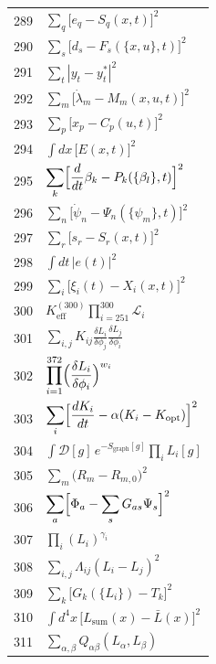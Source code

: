 \documentclass[12pt,a4paper]{article}
\begin{document}
\begin{longtable}{r p{}}
	289 & \(\displaystyle \sum_q\bigl[e_q - S_q(x,t)\bigr]^2\) \\
	290 & \(\displaystyle \sum_s\bigl[d_s - F_s(\{x,u\},t)\bigr]^2\) \\
	291 & \(\displaystyle \sum_t|y_t - y_t^*|^2\) \\
	292 & \(\displaystyle \sum_m\bigl[\dot\lambda_m - M_m(x,u,t)\bigr]^2\) \\
	293 & \(\displaystyle \sum_p\bigl[x_p - C_p(u,t)\bigr]^2\) \\
	294 & \(\displaystyle \int dx\,\bigl[E(x,t)\bigr]^2\) \\
	295 & \(\displaystyle \sum_k\Bigl[\frac{d}{dt}\beta_k - P_k(\{\beta_l\},t)\Bigr]^2\) \\
	296 & \(\displaystyle \sum_n\bigl[\dot\psi_n - \Psi_n(\{\psi_m\},t)\bigr]^2\) \\
	297 & \(\displaystyle \sum_r\bigl[s_r - S_r(x,t)\bigr]^2\) \\
	298 & \(\displaystyle \int dt\,|e(t)|^2\) \\
	299 & \(\displaystyle \sum_i\bigl[\xi_i(t) - X_i(x,t)\bigr]^2\) \\
	300 & \(\displaystyle K^{(300)}_{\mathrm{eff}}\prod_{i=251}^{300}\mathcal{L}_i\) \\
	301 & \(\displaystyle \sum_{i,j}K_{ij}\frac{\delta L_i}{\delta\phi_j}\frac{\delta L_j}{\delta\phi_i}\) \\
	302 & \(\displaystyle \prod_{i=1}^{372}\Bigl(\frac{\delta L_i}{\delta\phi_i}\Bigr)^{w_i}\) \\
	303 & \(\displaystyle \sum_i\Bigl[\frac{dK_i}{dt} - \alpha(K_i - K_{\text{opt}})\Bigr]^2\) \\
	304 & \(\displaystyle \int\mathcal{D}[g]\,e^{-S_{\text{graph}}[g]}\prod_i L_i[g]\) \\
	305 & \(\displaystyle \sum_m\bigl(R_m - R_{m,0}\bigr)^2\) \\
	306 & \(\displaystyle \sum_a\Bigl[\Phi_a - \sum_s G_{as}\Psi_s\Bigr]^2\) \\
	307 & \(\displaystyle \prod_i(L_i)^{\gamma_i}\) \\
	308 & \(\displaystyle \sum_{i,j}\Lambda_{ij}(L_i - L_j)^2\) \\
	309 & \(\displaystyle \sum_k\bigl[G_k(\{L_i\}) - T_k\bigr]^2\) \\
	310 & \(\displaystyle \int d^4x\,\bigl[L_{\text{sum}}(x) - \bar L(x)\bigr]^2\) \\
	311 & \(\displaystyle \sum_{\alpha,\beta}Q_{\alpha\beta}(L_\alpha,L_\beta)\) \\

\end{longtable}
\end{document}

